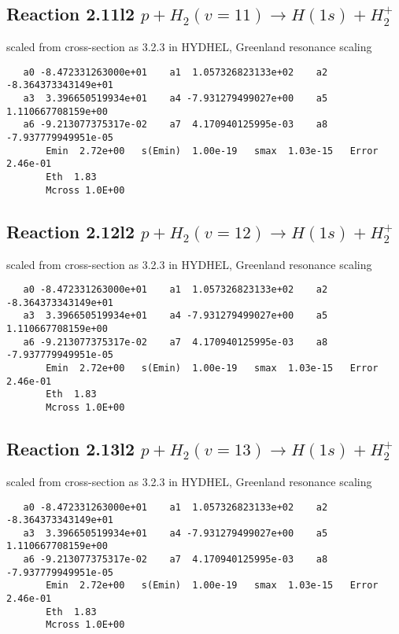 \documentclass[12pt,dvipdfmx]{article}
\begin{document}
\subsection{
Reaction 2.11l2 $   p + H_2(v=11) \rightarrow H(1s) + H_2^+$}

scaled from cross-section as 3.2.3 in HYDHEL, Greenland resonance scaling

\begin{small}\begin{verbatim}
   a0 -8.472331263000e+01    a1  1.057326823133e+02    a2 -8.364373343149e+01
   a3  3.396650519934e+01    a4 -7.931279499027e+00    a5  1.110667708159e+00
   a6 -9.213077375317e-02    a7  4.170940125995e-03    a8 -7.937779949951e-05
       Emin  2.72e+00   s(Emin)  1.00e-19   smax  1.03e-15   Error  2.46e-01
       Eth  1.83
       Mcross 1.0E+00
\end{verbatim}\end{small}

\subsection{
Reaction 2.12l2 $   p + H_2(v=12) \rightarrow H(1s) + H_2^+$}

scaled from cross-section as 3.2.3 in HYDHEL, Greenland resonance scaling

\begin{small}\begin{verbatim}
   a0 -8.472331263000e+01    a1  1.057326823133e+02    a2 -8.364373343149e+01
   a3  3.396650519934e+01    a4 -7.931279499027e+00    a5  1.110667708159e+00
   a6 -9.213077375317e-02    a7  4.170940125995e-03    a8 -7.937779949951e-05
       Emin  2.72e+00   s(Emin)  1.00e-19   smax  1.03e-15   Error  2.46e-01
       Eth  1.83
       Mcross 1.0E+00
\end{verbatim}\end{small}

\subsection{
Reaction 2.13l2 $   p + H_2(v=13) \rightarrow H(1s) + H_2^+$}

scaled from cross-section as 3.2.3 in HYDHEL, Greenland resonance scaling

\begin{small}\begin{verbatim}
   a0 -8.472331263000e+01    a1  1.057326823133e+02    a2 -8.364373343149e+01
   a3  3.396650519934e+01    a4 -7.931279499027e+00    a5  1.110667708159e+00
   a6 -9.213077375317e-02    a7  4.170940125995e-03    a8 -7.937779949951e-05
       Emin  2.72e+00   s(Emin)  1.00e-19   smax  1.03e-15   Error  2.46e-01
       Eth  1.83
       Mcross 1.0E+00
\end{verbatim}\end{small}
\end{document}
